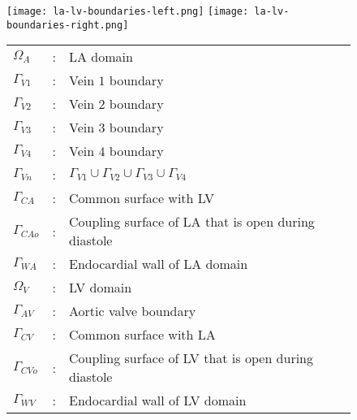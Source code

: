 \documentclass[3p]{elsarticle}
\begin{document}
\begin{figure}[ht!]
    \centering
    \begin{minipage}{0.62\linewidth}
        \texttt{[image: la-lv-boundaries-left.png]}
        \texttt{[image: la-lv-boundaries-right.png]}
    \end{minipage}\begin{minipage}{0.37\linewidth}
        \hspace{-3cm}
        \footnotesize
        \begin{tabular}{ l  c  l }
                                    $\Omega_A$      &:& LA domain                                                           \\
            $\Gamma_{V1}$   &:& Vein $1$ boundary                                                   \\
            $\Gamma_{V2}$   &:& Vein $2$ boundary                                                   \\
            $\Gamma_{V3}$   &:& Vein $3$ boundary                                                   \\
            $\Gamma_{V4}$   &:& Vein $4$ boundary                                                   \\
            $\Gamma_{Vn}$   &:& $\Gamma_{V1} \cup \Gamma_{V2} \cup \Gamma_{V3} \cup \Gamma_{V4}$    \\
            $\Gamma_{CA}$   &:& Common surface with LV                                              \\
            $\Gamma_{CAo}$  &:& Coupling surface of LA that is open during diastole  \\
            $\Gamma_{WA}$   &:& Endocardial wall of LA domain                                       \\
                        \hline
            $\Omega_{V}$    &:& LV domain                                                           \\
            $\Gamma_{AV}$   &:& Aortic valve boundary                                               \\
            $\Gamma_{CV}$   &:& Common surface with LA                                              \\
            $\Gamma_{CVo}$  &:& Coupling surface of LV that is open during diastole  \\
            $\Gamma_{WV}$   &:& Endocardial wall of LV domain                                       \\

\end{tabular}
\end{minipage}
\end{figure}
\end{document}

